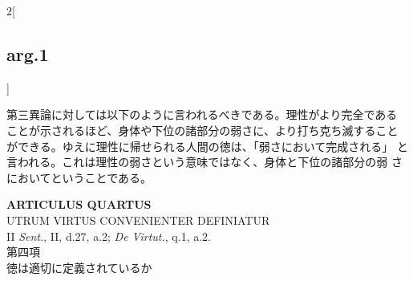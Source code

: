 \documentclass[paper=a4paper,fontsize=10pt,jafontsize=9pt,titlepage]{jlreq}
\begin{document}
\begin{paracol}{2}[\subsection{arg.1}]
\switchcolumn

第三異論に対しては以下のように言われるべきである。理性がより完全である
ことが示されるほど、身体や下位の諸部分の弱さに、より打ち克ち滅すること
ができる。ゆえに理性に帰せられる人間の徳は、「弱さにおいて完成される」
と言われる。これは理性の弱さという意味ではなく、身体と下位の諸部分の弱
さにおいてということである。

\end{paracol}
\newpage
{}
{}
\setcounter{section}{4}
\setcounter{subsection}{0}


\begin{center}
{\Large {\bfseries ARTICULUS QUARTUS}}\\
{\large UTRUM VIRTUS CONVENIENTER DEFINIATUR}\\
{\footnotesize II {\itshape Sent.}, II, d.27, a.2; {\itshape De Virtut.}, q.1, a.2.}\\
{\Large 第四項\\徳は適切に定義されているか}
\end{center}
\end{document}
